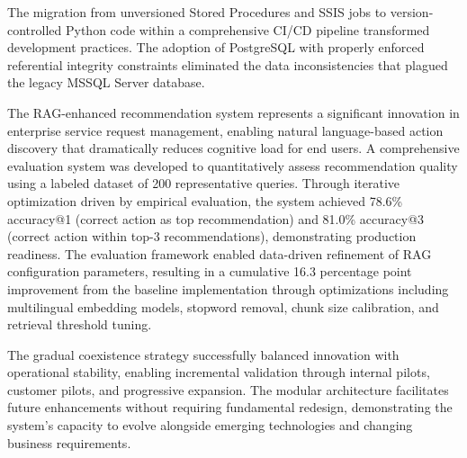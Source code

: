 The migration from unversioned Stored Procedures and SSIS jobs to version-controlled Python code within a comprehensive CI/CD pipeline transformed development practices. The adoption of PostgreSQL with properly enforced referential integrity constraints eliminated the data inconsistencies that plagued the legacy MSSQL Server database.

The RAG-enhanced recommendation system represents a significant innovation in enterprise service request management, enabling natural language-based action discovery that dramatically reduces cognitive load for end users. A comprehensive evaluation system was developed to quantitatively assess recommendation quality using a labeled dataset of 200 representative queries. Through iterative optimization driven by empirical evaluation, the system achieved 78.6\% accuracy@1 (correct action as top recommendation) and 81.0\% accuracy@3 (correct action within top-3 recommendations), demonstrating production readiness. The evaluation framework enabled data-driven refinement of RAG configuration parameters, resulting in a cumulative 16.3 percentage point improvement from the baseline implementation through optimizations including multilingual embedding models, stopword removal, chunk size calibration, and retrieval threshold tuning.

The gradual coexistence strategy successfully balanced innovation with operational stability, enabling incremental validation through internal pilots, customer pilots, and progressive expansion. The modular architecture facilitates future enhancements without requiring fundamental redesign, demonstrating the system's capacity to evolve alongside emerging technologies and changing business requirements.